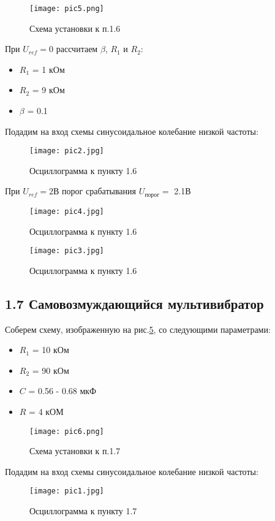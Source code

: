 \documentclass[a4paper,12pt]{report}
\begin{document}
\begin{figure}[H]
    \texttt{[image: pic5.png]}
    \caption{Схема установки к п.1.6}
    \label{p5}
\end{figure}

При $U_{ref} = 0$ рассчитаем $\beta$, $R_{1}$ и $R_{2}$:
\begin{itemize}
    \item $R_{1}$ = 1 кОм
    \item $R_{2}$ = 9 кОм
    \item $\beta$ = 0.1
\end{itemize}

Подадим на вход схемы синусоидальное колебание низкой частоты:

\begin{figure}[H]
    \texttt{[image: pic2.jpg]}
    \caption{Осциллограмма к пункту 1.6}
    \label{pic2}
\end{figure}

При $U_{ref} = 2$В порог срабатывания $U_{\text{порог}} = $ 2.1В

\begin{figure}[H]
    \texttt{[image: pic4.jpg]}
    \caption{Осциллограмма к пункту 1.6}
    \label{pic4}
\end{figure}

\begin{figure}[H]
    \texttt{[image: pic3.jpg]}
    \caption{Осциллограмма к пункту 1.6}
    \label{pic3}
\end{figure}

\subsection*{1.7 Самовозмуждающийся мультивибратор}
Соберем схему, изображенную на рис.\ref{p6}, со следующими параметрами:
\begin{itemize}
    \item $R_{1}$ = 10 кОм
    \item $R_{2}$ = 90 кОм
    \item $C$ = 0.56 - 0.68 мкФ
    \item $R$ = 4 кОМ
\end{itemize}

\begin{figure}[H]
    \texttt{[image: pic6.png]}
    \caption{Схема установки к п.1.7}
    \label{p6}
\end{figure}

Подадим на вход схемы синусоидальное колебание низкой частоты:

\begin{figure}[h]
    \texttt{[image: pic1.jpg]}
    \caption{Осциллограмма к пункту 1.7}
    \label{pic1}
\end{figure}
\end{document}
